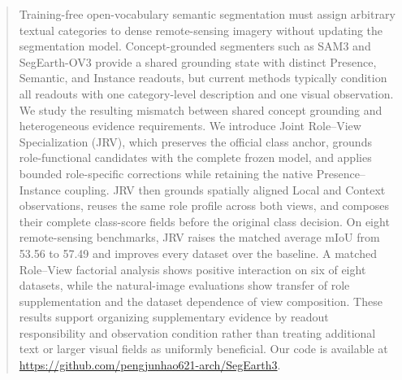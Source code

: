 \begin{abstract}
Training-free open-vocabulary semantic segmentation must assign arbitrary textual categories to dense remote-sensing imagery without updating the segmentation model. Concept-grounded segmenters such as SAM3 and SegEarth-OV3 provide a shared grounding state with distinct Presence, Semantic, and Instance readouts, but current methods typically condition all readouts with one category-level description and one visual observation. We study the resulting mismatch between shared concept grounding and heterogeneous evidence requirements. We introduce Joint Role--View Specialization (JRV), which preserves the official class anchor, grounds role-functional candidates with the complete frozen model, and applies bounded role-specific corrections while retaining the native Presence--Instance coupling. JRV then grounds spatially aligned Local and Context observations, reuses the same role profile across both views, and composes their complete class-score fields before the original class decision. On eight remote-sensing benchmarks, JRV raises the matched average mIoU from 53.56 to 57.49 and improves every dataset over the baseline. A matched Role--View factorial analysis shows positive interaction on six of eight datasets, while the natural-image evaluations show transfer of role supplementation and the dataset dependence of view composition. These results support organizing supplementary evidence by readout responsibility and observation condition rather than treating additional text or larger visual fields as uniformly beneficial. Our code is available at \url{https://github.com/pengjunhao621-arch/SegEarth3}.
\end{abstract}
